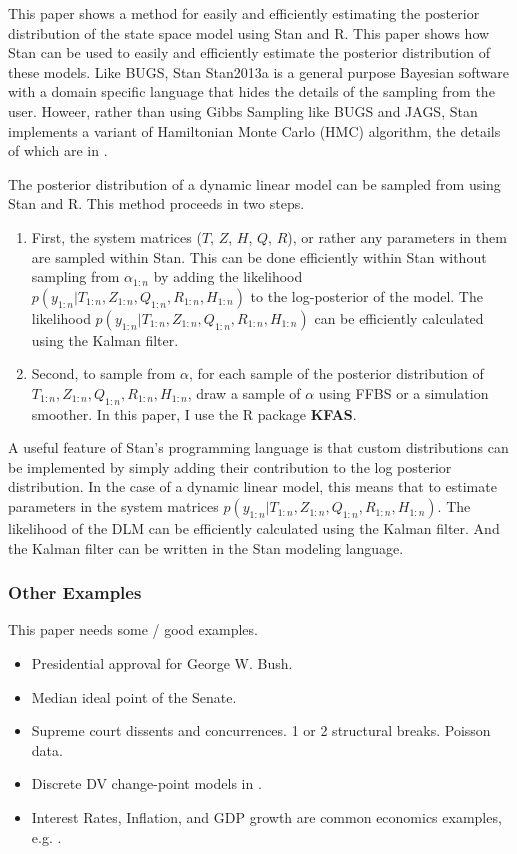 \documentclass{article}
\begin{document}
This paper shows a method for easily and efficiently estimating the posterior distribution of the state space model using Stan and R.
This paper shows how Stan can be used to easily and efficiently estimate the posterior distribution of these models.
Like BUGS, Stan \textcite{Stan2013}{Stan2013a} is a general purpose Bayesian software with a domain specific language that hides the details of the sampling from the user.
Howeer, rather than using Gibbs Sampling like BUGS and JAGS, Stan implements a variant of Hamiltonian Monte Carlo (HMC) algorithm, the details of which are in \textcite{HoffmanGelman2013}.

The posterior distribution of a dynamic linear model can be sampled from using Stan and R.
This method proceeds in two steps.
\begin{enumerate}
\item First, the system matrices ($T$, $Z$, $H$, $Q$, $R$), or rather any parameters in them are sampled within Stan. This can be done efficiently within Stan without sampling from $\alpha_{1:n}$ by adding the likelihood $p(y_{1:n} | T_{1:n}, Z_{1:n}, Q_{1:n}, R_{1:n}, H_{1:n})$ to the log-posterior of the model.
The likelihood $p(y_{1:n} | T_{1:n}, Z_{1:n}, Q_{1:n}, R_{1:n}, H_{1:n})$ can be efficiently calculated using the Kalman filter.
\item Second, to sample from $\alpha$, for each sample of the posterior distribution of $T_{1:n}, Z_{1:n}, Q_{1:n}, R_{1:n}, H_{1:n}$, draw a sample of $\alpha$ using FFBS or a simulation smoother. In this paper, I use the R package \textbf{KFAS}.
\end{enumerate}

A useful feature of Stan's programming language is that custom distributions can be implemented by simply adding their contribution to the log posterior distribution.
In the case of a dynamic linear model, this means that to estimate parameters in the system matrices  $p(y_{1:n} | T_{1:n}, Z_{1:n}, Q_{1:n}, R_{1:n}, H_{1:n})$.
The likelihood of the DLM can be efficiently calculated using the Kalman filter. 
And the Kalman filter can be written in the Stan modeling language.

\subsubsection{Other Examples}

This paper needs some / good examples.

\begin{itemize}
\item Presidential approval for George W. Bush. \parencites{RatkovicEng2010}
\item Median ideal point of the Senate. \parencites{RatkovicEng2010}
\item Supreme court dissents and concurrences. 1 or 2 structural breaks. Poisson data. \parencite{CalderiaZorn1998}
\item Discrete DV change-point models in \parencite{spirling2007bayesian}.
\item Interest Rates, Inflation, and GDP growth are common economics examples, e.g. \textcite{GiordaniKohn2008}.
\end{itemize}
\end{document}
